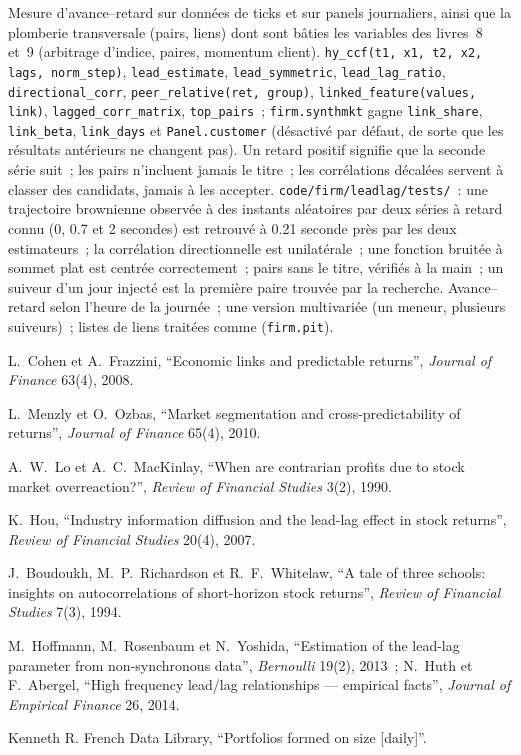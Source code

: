 \begin{build}
 Mesure d'avance--retard sur données de ticks et sur panels journaliers, ainsi que la plomberie transversale (pairs, liens) dont sont bâties les
variables des livres~8 et~9 (arbitrage d'indice, paires, momentum client).
 \texttt{hy\_ccf(t1, x1, t2, x2, lags, norm\_step)}, \texttt{lead\_estimate}, \texttt{lead\_symmetric}, \texttt{lead\_lag\_ratio},
\texttt{directional\_corr}, \texttt{peer\_relative(ret, group)}, \texttt{linked\_feature(values, link)}, \texttt{lagged\_corr\_matrix},
\texttt{top\_pairs}~; \texttt{firm.synthmkt} gagne \texttt{link\_share}, \texttt{link\_beta}, \texttt{link\_days} et \texttt{Panel.customer}
(désactivé par défaut, de sorte que les résultats antérieurs ne changent pas).
 Un retard positif signifie que la seconde série suit~; les pairs n'incluent jamais le titre~; les corrélations décalées servent à classer
des candidats, jamais à les accepter.
 \texttt{code/firm/leadlag/tests/}~: une trajectoire brownienne observée à des instants aléatoires par deux séries à retard connu
(0, 0.7 et 2 secondes) est retrouvé à 0.21 seconde près par les deux estimateurs~; la corrélation directionnelle est unilatérale~; une fonction bruitée à sommet plat
est centrée correctement~; pairs sans le titre, vérifiés à la main~; un suiveur d'un jour injecté est la première paire trouvée par la recherche.
 Avance--retard selon l'heure de la journée~; une version multivariée (un meneur, plusieurs suiveurs)~; listes de liens traitées comme 
(\texttt{firm.pit}).
\end{build}

\begin{omsources}
\item L.~Cohen et A.~Frazzini, ``Economic links and predictable returns'', \emph{Journal of Finance} 63(4), 2008.
\item L.~Menzly et O.~Ozbas, ``Market segmentation and cross-predictability of returns'', \emph{Journal of Finance} 65(4), 2010.
\item A.~W.~Lo et A.~C.~MacKinlay, ``When are contrarian profits due to stock market overreaction?'', \emph{Review of Financial Studies}
3(2), 1990.
\item K.~Hou, ``Industry information diffusion and the lead-lag effect in stock returns'', \emph{Review of Financial Studies} 20(4), 2007.
\item J.~Boudoukh, M.~P.~Richardson et R.~F.~Whitelaw, ``A tale of three schools: insights on autocorrelations of short-horizon stock
returns'', \emph{Review of Financial Studies} 7(3), 1994.
\item M.~Hoffmann, M.~Rosenbaum et N.~Yoshida, ``Estimation of the lead-lag parameter from non-synchronous data'', \emph{Bernoulli} 19(2),
2013~; N.~Huth et F.~Abergel, ``High frequency lead/lag relationships --- empirical facts'', \emph{Journal of Empirical Finance} 26, 2014.
\item Kenneth R. French Data Library, ``Portfolios formed on size [daily]''.
\end{omsources}

